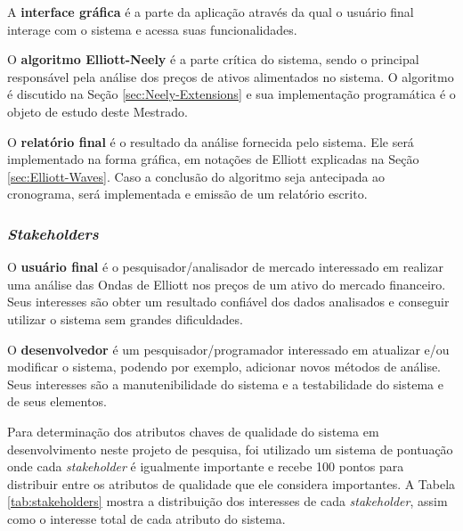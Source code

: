 \documentclass[12pt]{article}
\begin{document}
A \textbf{interface gráfica} é a parte da aplicação através da qual o usuário final interage
com o sistema e acessa suas funcionalidades.

O \textbf{algoritmo Elliott-Neely} é a parte crítica do sistema, sendo o principal responsável
pela análise dos preços de ativos alimentados no sistema. O algoritmo é discutido na Seção
\ref{sec:Neely-Extensions} e sua implementação programática é o objeto de estudo deste
Mestrado.

O \textbf{relatório final} é o resultado da análise fornecida pelo sistema. Ele será
implementado na forma gráfica, em notações de Elliott explicadas na Seção
\ref{sec:Elliott-Waves}. Caso a conclusão do algoritmo seja antecipada ao cronograma,
será implementada e emissão de um relatório escrito.

\subsubsection{\textit{Stakeholders}}

O \textbf{usuário final} é o pesquisador/analisador de mercado interessado em realizar uma
análise das Ondas de Elliott nos preços de um ativo do mercado financeiro. Seus interesses são
obter um resultado confiável dos dados analisados e conseguir utilizar o sistema sem grandes
dificuldades.

O \textbf{desenvolvedor} é um pesquisador/programador interessado em atualizar e/ou modificar
o sistema, podendo por exemplo, adicionar novos métodos de análise. Seus interesses são a
manutenibilidade do sistema e a testabilidade do sistema e de seus elementos.

Para determinação dos atributos chaves de qualidade do sistema em desenvolvimento neste
projeto de pesquisa, foi utilizado um sistema de pontuação onde cada \textit{stakeholder}
é igualmente importante e recebe 100 pontos para distribuir entre os atributos de qualidade
que ele considera importantes.
A Tabela \ref{tab:stakeholders} mostra a distribuição dos interesses de cada 
\textit{stakeholder}, assim como o interesse total de cada atributo do sistema.
\end{document}
